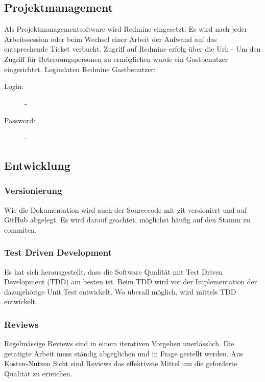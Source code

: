 \documentclass[a4,12pt]{scrartcl}
\begin{document}
\subsection{Projektmanagement}
Als Projektmanagementsoftware wird Redmine eingesetzt. 
Es wird nach jeder Arbeitssession oder beim Wechsel einer Arbeit der Aufwand auf das entsprechende Ticket verbucht.
Zugriff auf Redmine erfolg über die Url: - %
Um den Zugriff für Betreuungspersonen zu ermöglichen wurde ein Gastbenutzer eingerichtet.
\newline
\newline
Logindaten Redmine Gastbenutzer:
\begin{description}
\begin{description}
\item [Login:]
-
\item [Password:]
-
\end{description}
\end{description}


\subsection{Entwicklung}

\subsubsection{Versionierung}
Wie die Dokumentation wird auch der Sourcecode mit git versioniert und auf GitHub abgelegt. Es wird darauf geachtet, möglichst häufig auf den Stamm zu commiten.
\subsubsection{Test Driven Development}
Es hat sich herausgestellt, dass die Software Qualität mit Test Driven Development (TDD) am besten ist. Beim TDD wird vor der Implementation der dazugehörige Unit Test entwickelt. Wo überall möglich, wird mittels TDD entwickelt.
\subsubsection{Reviews}
Regelmässige Reviews sind in einem iterativen Vorgehen unerlässlich. Die getätigte Arbeit muss ständig abgeglichen und in Frage gestellt werden. Aus Kosten-Nutzen Sicht sind Reviews das effektivste Mittel um die geforderte Qualität zu erreichen.\\ 
\end{document}
